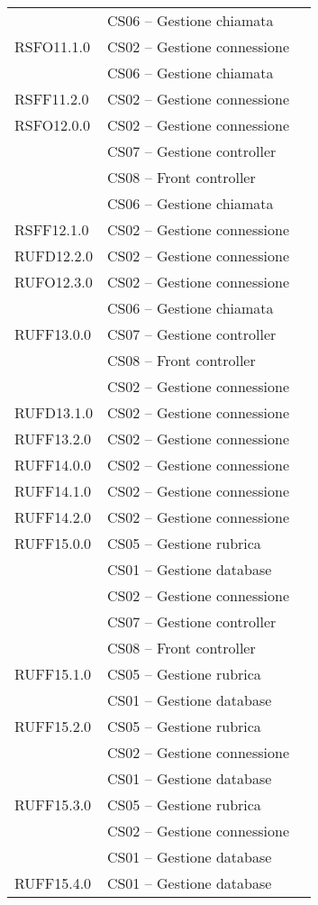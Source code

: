 \begin{center}
\begin{longtable}{lp{}l}
  & CS06 -- Gestione chiamata \\
RSFO11.1.0 & CS02 -- Gestione connessione \\
  & CS06 -- Gestione chiamata \\
RSFF11.2.0 & CS02 -- Gestione connessione \\
RSFO12.0.0 & CS02 -- Gestione connessione \\
 & CS07 -- Gestione controller \\
  & CS08 -- Front controller \\
   & CS06 -- Gestione chiamata \\
RSFF12.1.0 & CS02 -- Gestione connessione \\
RUFD12.2.0 & CS02 -- Gestione connessione \\
RUFO12.3.0 & CS02 -- Gestione connessione \\
  & CS06 -- Gestione chiamata \\
RUFF13.0.0 & CS07 -- Gestione controller \\
 & CS08 -- Front controller \\
 & CS02 -- Gestione connessione \\
RUFD13.1.0 & CS02 -- Gestione connessione \\
RUFF13.2.0 & CS02 -- Gestione connessione \\
RUFF14.0.0 & CS02 -- Gestione connessione \\
RUFF14.1.0 & CS02 -- Gestione connessione \\
RUFF14.2.0 & CS02 -- Gestione connessione \\
RUFF15.0.0 & CS05 -- Gestione rubrica \\
 & CS01 -- Gestione database \\
 & CS02 -- Gestione connessione \\
 & CS07 -- Gestione controller \\
  & CS08 -- Front controller \\
RUFF15.1.0 & CS05 -- Gestione rubrica \\
 & CS01 -- Gestione database \\
RUFF15.2.0 & CS05 -- Gestione rubrica \\
 & CS02 -- Gestione connessione \\
 & CS01 -- Gestione database \\
RUFF15.3.0 & CS05 -- Gestione rubrica \\
 & CS02 -- Gestione connessione \\
 & CS01 -- Gestione database \\
RUFF15.4.0 & CS01 -- Gestione database \\

\end{longtable}
\end{center}
